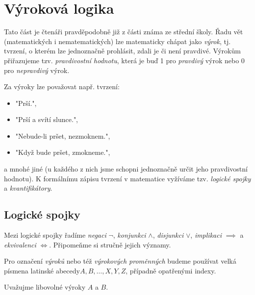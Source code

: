 \section{Výroková logika}\label{sec:vyrokova_logika}

Tato část je čtenáři pravděpodobně již z části známa ze střední školy. Řadu vět (matematických i nematematických) lze matematicky chápat jako \emph{výrok}, tj. tvrzení, o kterém lze jednoznačně prohlásit, zdali je či není pravdivé. Výrokům přiřazujeme tzv. \emph{pravdivostní hodnotu}, která je buď 1 pro \emph{pravdivý} výrok nebo 0 pro \emph{nepravdivý} výrok.\par
Za výroky lze považovat např. tvrzení:
\begin{itemize}
    \item "Prší.",
    \item "Prší a svítí slunce.",
    \item "Nebude-li pršet, nezmoknem.",
    \item "Když bude pršet, zmokneme.",
\end{itemize}
a mnohé jiné (u každého z nich jsme schopni jednoznačně určit jeho pravdivostní hodnotu). K formálnímu zápisu tvrzení v matematice vyžíváme tzv. \emph{logické spojky} a \emph{kvantifikátory}.

\subsection{Logické spojky}\label{subsec:logicke_spojky}

Mezi logické spojky řadíme \emph{negaci} $\neg$, \emph{konjunkci} $\land$, \emph{disjunkci} $\lor$, \emph{implikaci} $\implies$ a \emph{ekvivalenci} $\iff$. Připomeňme si stručně jejich významy.

\begin{convention}
    \label{conv:abeceda_vyrokovych_promennych}
    Pro označení \emph{výroků} nebo též \emph{výrokových proměnných} budeme používat velká písmena latinské abecedy\linebreak $A,B,\ldots,X,Y,Z$, případně opatřenými indexy.
\end{convention}

Uvažujme libovolné výroky $A$ a $B$.

